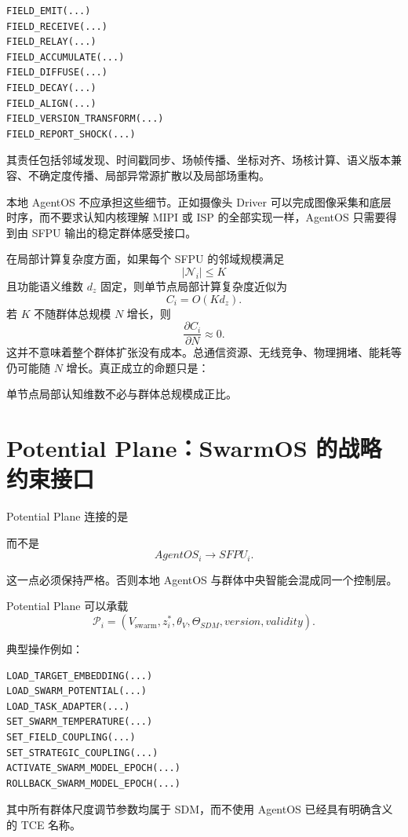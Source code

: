 \begin{verbatim}
FIELD_EMIT(...)
FIELD_RECEIVE(...)
FIELD_RELAY(...)
FIELD_ACCUMULATE(...)
FIELD_DIFFUSE(...)
FIELD_DECAY(...)
FIELD_ALIGN(...)
FIELD_VERSION_TRANSFORM(...)
FIELD_REPORT_SHOCK(...)
\end{verbatim}

其责任包括邻域发现、时间戳同步、场帧传播、坐标对齐、场核计算、语义版本兼容、不确定度传播、局部异常源扩散以及局部场重构。

本地 AgentOS 不应承担这些细节。正如摄像头 Driver 可以完成图像采集和底层时序，而不要求认知内核理解 MIPI 或 ISP 的全部实现一样，AgentOS 只需要得到由 SFPU 输出的稳定群体感受接口。

在局部计算复杂度方面，如果每个 SFPU 的邻域规模满足
\[
|\mathcal N_i|
\leq K
\]
且功能语义维数 $d_z$ 固定，则单节点局部计算复杂度近似为
\[
C_i
=
O(Kd_z).
\]
若 $K$ 不随群体总规模 $N$ 增长，则
\[
\frac{\partial C_i}{\partial N}
\approx0.
\]
这并不意味着整个群体扩张没有成本。总通信资源、无线竞争、物理拥堵、能耗等仍可能随 $N$ 增长。真正成立的命题只是：
\begin{proposition*}
单节点局部认知维数不必与群体总规模成正比。
\end{proposition*}


\section{Potential Plane：SwarmOS 的战略约束接口}

Potential Plane 连接的是
\begin{statementbox}
\centering
{}
\end{statementbox}
而不是
\[
AgentOS_i
\rightarrow
SFPU_i.
\]

这一点必须保持严格。否则本地 AgentOS 与群体中央智能会混成同一个控制层。

Potential Plane 可以承载
\[
\mathcal P_i
=
(
V_{\mathrm{swarm}},
z_i^*,
\theta_V,
\Theta_{SDM},
version,
validity
).
\]

典型操作例如：

\begin{verbatim}
LOAD_TARGET_EMBEDDING(...)
LOAD_SWARM_POTENTIAL(...)
LOAD_TASK_ADAPTER(...)
SET_SWARM_TEMPERATURE(...)
SET_FIELD_COUPLING(...)
SET_STRATEGIC_COUPLING(...)
ACTIVATE_SWARM_MODEL_EPOCH(...)
ROLLBACK_SWARM_MODEL_EPOCH(...)
\end{verbatim}

其中所有群体尺度调节参数均属于 SDM，而不使用 AgentOS 已经具有明确含义的 TCE 名称。

